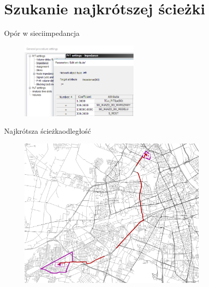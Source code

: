 \documentclass[8pt]{beamer}
\begin{document}
\section{Szukanie najkrótszej ścieżki}
\begin{frame}{Opór w sieci}{impedancja}
\begin{figure}\begin{center}
\includegraphics[width=0.5\textwidth]{imp}
 \end{center}  \end{figure} 
\end{frame}

\begin{frame}{Najkrótsza ścieżka}{odległość}
\begin{figure}\begin{center}
\includegraphics[width=0.8\textwidth]{path_dist}
 \end{center}  \end{figure} 
\end{frame}
\end{document}
